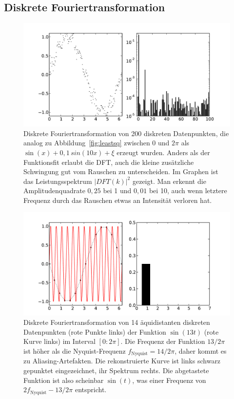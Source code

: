 \subsection{Diskrete Fouriertransformation}

\begin{figure}
  \centering
  \includegraphics[width=\textwidth]{plots/fftsin}
  \caption{Diskrete Fouriertransformation von 200 diskreten
    Datenpunkten, die analog zu Abbildung~\ref{fig:leastsq} zwischen 0
    und $2\pi$ als $\sin(x) + 0,1\,sin(10 x) + \xi$ erzeugt wurden.
    Anders als der Funktionsfit erlaubt die DFT, auch die kleine
    zusätzliche Schwingung gut vom Rauschen zu unterscheiden. Im
    Graphen ist das Leistungsspektrum $\lvert DFT(k)\rvert^2$ gezeigt.
    Man erkennt die Amplitudenquadrate $0,25$ bei 1 und $0,01$ bei 10,
    auch wenn letztere Frequenz durch das Rauschen etwas an Intensität
    verloren hat.
  }
  \label{fig:fouriersin}
\end{figure}

\begin{figure}
  \centering
  \includegraphics[width=\textwidth]{plots/fftalias}
  \caption{Diskrete Fouriertransformation von 14 äquidistanten
    diskreten Datenpunkten (rote Punkte links) der Funktion
    $\sin(13t)$ (rote Kurve links) im Interval $[0:2\pi]$.  Die
    Frequenz der Funktion $13/2\pi$ ist höher als die Nyquist-Frequenz
    $f_\text{Nyquist}=14/2\pi$, daher kommt es zu
    Aliasing-Artefakten. Die rekonstruierte Kurve ist links schwarz
    gepunktet eingezeichnet, ihr Spektrum rechts. Die abgetastete
    Funktion ist also scheinbar $\sin(t)$, was einer Frequenz von
    $2f_\text{Nyquist} - 13/2\pi$ entspricht.}
  \label{fig:fourieralias}
\end{figure}

